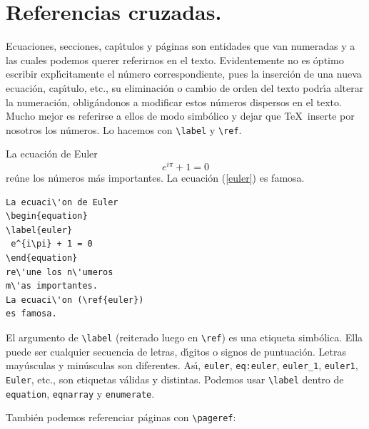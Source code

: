 {%

\section{Referencias cruzadas.}
\label{referencias}

Ecuaciones, secciones, cap{\'\i}tulos y p{\'a}ginas son entidades que van
numeradas y a las cuales podemos querer referirnos en el texto.
Evidentemente no es {\'o}ptimo escribir expl{\'\i}citamente el n{\'u}mero
correspondiente, pues la inserci{\'o}n de una nueva ecuaci{\'o}n, cap{\'\i}tulo,
etc., su eliminaci{\'o}n o cambio de orden del texto podr{\'\i}a alterar la
numeraci{\'o}n, oblig{\'a}ndonos a modificar estos n{\'u}meros dispersos en el
texto. Mucho mejor es referirse a ellos de modo simb{\'o}lico y dejar que
\TeX\ inserte por nosotros los n{\'u}meros. Lo hacemos con \verb+\label+ y
\verb+\ref+.

\vspace{.3cm}
{\small
\begin{minipage}[t]{5cm}
La ecuaci\'on de Euler
\begin{equation}
\label{euler}
 e^{i\pi} + 1 = 0 
\end{equation}
re\'une los n\'umeros m\'as importantes. 
La ecuaci\'on (\ref{euler}) es famosa.
\end{minipage}
\hspace{2cm}
\begin{minipage}[t]{5cm}
\begin{verbatim}
La ecuaci\'on de Euler
\begin{equation}
\label{euler}
 e^{i\pi} + 1 = 0 
\end{equation}
re\'une los n\'umeros 
m\'as importantes. 
La ecuaci\'on (\ref{euler}) 
es famosa.
\end{verbatim}
\end{minipage}
}
\vspace{.3cm}

El argumento de \verb+\label+ (reiterado luego en \verb+\ref+) es una
etiqueta simb{\'o}lica. Ella puede ser cualquier secuencia de
letras, d{\'\i}gitos o signos de puntuaci{\'o}n. Letras may{\'u}sculas y
min{\'u}sculas son diferentes. As{\'\i}, \verb+euler+, \verb+eq:euler+,
\verb+euler_1+, \verb+euler1+, \verb+Euler+, etc., son etiquetas
v{\'a}lidas y distintas. Podemos usar \verb+\label+ dentro de
\verb+equation+, \verb+eqnarray+ y \verb+enumerate+. 

Tambi{\'e}n podemos referenciar p{\'a}ginas con \verb+\pageref+:

}
